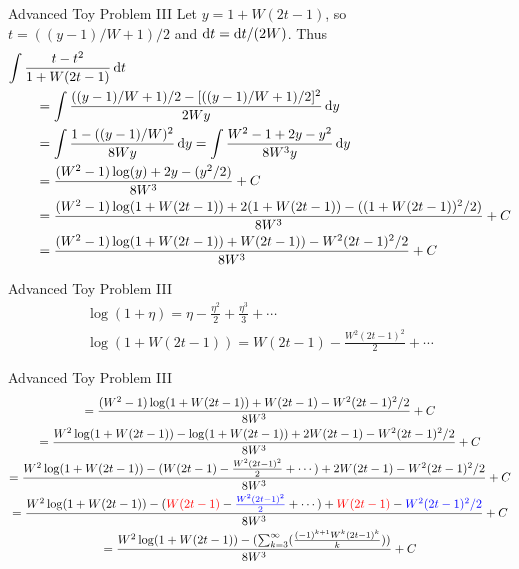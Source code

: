 \documentclass[11pt,compress,xcolor={usenames,dvipsnames},aspectratio=169]{beamer}
\begin{document}
\begin{frame}{Advanced Toy Problem III}
\vspace{-2ex}
Let $y=1 + W(2t-1)$, so $t = ((y-1)/W +1)/2$ and ${\rm d} t = {\rm d} t/(2W)$.  Thus
\begin{align*}
    \MoveEqLeft{\int \frac{t - t^2}{1 +  W (2t-1)} \, \dif t} \\
    & =  \int \frac{((y-1)/W +1)/2 -[((y-1)/W +1)/2]^2}{2W y} \, \dif y \\ 
    & =  \int \frac{1 -((y-1)/W)^2}{8Wy} \, \dif y 
    =  \int \frac{W^2 -1 + 2y -y^2}{8W^3y} \, \dif y \\
    & = \frac{(W^2 -1) \log(y) +2 y - (y^2/2)}{8W^3} + C\\
    & = \frac{(W^2 -1) \log(1+W(2t-1)) +2 (1 + W(2t-1))- ((1 + W(2t-1))^2/2)}{8W^3} + C\\
    & = \frac{(W^2 -1) \log(1+W(2t-1)) + W(2t-1))- W^2(2t-1)^2/2}{8W^3} + C \\
\end{align*}

\end{frame}

\begin{frame}{Advanced Toy Problem III}
\vspace{-2ex}
\begin{gather*}
\log(1+ \eta) = \eta - \frac{\eta^2}{2} + \frac{\eta^3}{3} + \cdots \\
 \log(1+W(2t-1)) =  W(2t-1) - \frac{ W^2(2t-1)^2}{2} + \cdots
\end{gather*}
\end{frame}

\begin{frame}{Advanced Toy Problem III}
\begin{gather*}
    = \frac{(W^2 -1) \log(1+W(2t-1)) + W(2t-1)- W^2(2t-1)^2/2}{8W^3} + C \\
    = \frac{W^2\log(1+W(2t-1)) -\log(1+W(2t-1))  + 2W(2t-1)- W^2(2t-1)^2/2}{8W^3} + C \\
    = \frac{W^2\log(1+W(2t-1)) -(W(2t-1) - \frac{ W^2(2t-1)^2}{2} + \cdots)  + 2W(2t-1)- W^2(2t-1)^2/2}{8W^3} + C \\
    = \frac{W^2\log(1+W(2t-1)) -(\textcolor{red}{W(2t-1)} - \textcolor{blue}{\frac{ W^2(2t-1)^2}{2}} + \cdots)  + \textcolor{red}{W(2t-1)} - \textcolor{blue}{W^2(2t-1)^2/2}}{8W^3} + C \\
    = \frac{W^2\log(1+W(2t-1)) -(\sum_{k=3}^{\infty}(\frac{(-1)^{k+1}W^k(2t-1)^k}{k})) }{8W^3} + C \\
\end{gather*}


\end{frame}
\end{document}
